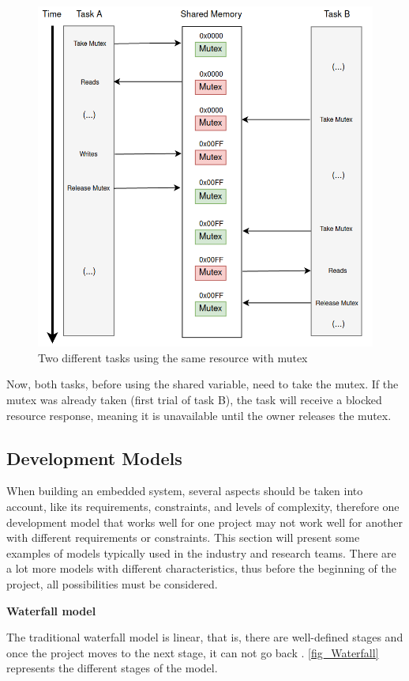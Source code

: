 \begin{figure}[H]
	\centering
 	\includegraphics[width=0.7\linewidth]{Images/AfterMutex.png}
 	\caption{ Two different tasks using the same resource with mutex }
	 \label{fig_AfterMutex}
\end{figure}

Now, both tasks, before using the shared variable, need to take the mutex. If the mutex was already taken (first trial of task B), 
the task will receive a blocked resource response, meaning it is unavailable until the owner releases the mutex. 


\subsection{Development Models}
\label{sub_sec::DevModels}

When building an embedded system, several aspects should be taken into account, like its requirements, constraints, and levels of complexity, 
therefore one development model that works well for one project may not work well for another with different requirements or constraints. This 
section will present some examples of models typically used in the industry and research teams. There are a lot more models with different 
characteristics, thus before the beginning of the project, all possibilities must be considered.
\newline

\textbf{Waterfall model}
\newline

The traditional waterfall model is linear, that is, there are well-defined stages and once the project moves to the next stage, it can not go 
back \cite{waterfallModel}. \autoref{fig_Waterfall} represents the different stages of the model. 

